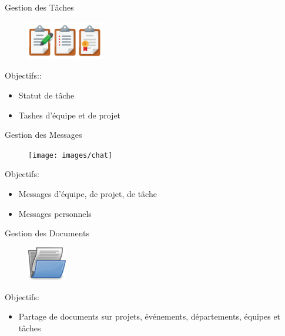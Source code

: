 \begin{frame}{Gestion des Tâches}
\begin{figure}[h!]
  \includegraphics[width=0.3\textwidth]{images/tasks}
\end{figure}
Objectifs::
  \begin{itemize}
    \item Statut de tâche
    \item Tashes d'équipe et de projet
  \end{itemize}
\end{frame}

\begin{frame}{Gestion des Messages}
\begin{figure}[h!]
  \texttt{[image: images/chat]}
\end{figure}
Objectifs:
  \begin{itemize}
    \item Messages d'équipe, de projet, de tâche
    \item Messages personnels
  \end{itemize}
\end{frame}

\begin{frame}{Gestion des Documents}
\begin{figure}[h!]
  \includegraphics[width=0.15\textwidth]{images/document-open-hi}
\end{figure}
Objectifs:
  \begin{itemize}
    \item Partage de documents sur projets, événements, départements, équipes et tâches
  \end{itemize}
\end{frame}


